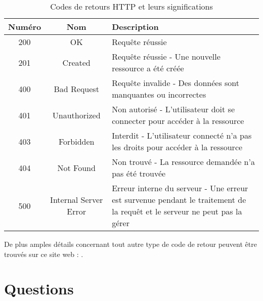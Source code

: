\begin{table}[H]
    \centering
    \caption{Codes de retours HTTP et leurs significations}
    \begin{tabular}{|c|c|p{8cm}|} %
        \hline
        \textbf{Numéro} & \textbf{Nom}          & \textbf{Description}                                                                                                      \\
        \hline
        200             & OK                    & Requête réussie                                                                                                           \\
        \hline
        201             & Created               & Requête réussie - Une nouvelle ressource a été créée                                                                      \\
        \hline
        400             & Bad Request           & Requête invalide - Des données sont manquantes ou incorrectes                                                             \\
        \hline
        401             & Unauthorized          & Non autorisé - L'utilisateur doit se connecter pour accéder à la ressource                                                \\
        \hline
        403             & Forbidden             & Interdit - L'utilisateur connecté n'a pas les droits pour accéder à la ressource                                          \\
        \hline
        404             & Not Found             & Non trouvé - La ressource demandée n'a pas été trouvée                                                                    \\
        \hline
        500             & Internal Server Error & Erreur interne du serveur - Une erreur est survenue pendant le traitement de la requêt et le serveur ne peut pas la gérer \\
        \hline
    \end{tabular}
\end{table}

De plus amples détails concernant tout autre type de code de retour peuvent être trouvés sur ce site web : \cite{StatusCode}.

\section{Questions}

